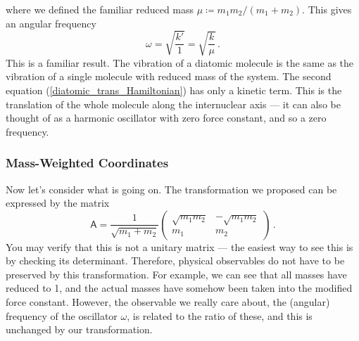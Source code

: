 \documentclass{article}
\theoremstyle{plain}\theoremheaderfont{\normalfont\itshape}\theorembodyfont{\rmfamily}\theoremseparator{.}\newtheorem*{rem}{Remark}\newtheorem*{ex}{Example}\newtheorem*{proof}{Proof}\newtheorem*{altp}{Alternative proof}
\theoremstyle{plain}\theoremheaderfont{\normalfont\bfseries}\theorembodyfont{\rmfamily}\theoremseparator{.}\newtheorem{thm}{Theorem}[section]\newtheorem{lem}[thm]{Lemma}\newtheorem{prop}[thm]{Proposition}\newtheorem*{cor}{Corollary}\newtheorem{defn}[thm]{Definition}\newtheorem{clm}[thm]{Claim}\newtheorem{clminproof}{Claim}
\theoremstyle{break}\theoremheaderfont{\normalfont\itshape}\theorembodyfont{\rmfamily}\theoremseparator{.\medskip}\newtheorem*{proofskip}{Proof}\newtheorem*{exs}{Examples}\newtheorem*{rems}{Remarks}
\theoremstyle{break}\theoremheaderfont{\normalfont\bfseries}\theorembodyfont{\rmfamily}\theoremseparator{.\medskip}\newtheorem{lemskip}[thm]{Lemma}\newtheorem{defnskip}[thm]{Definition}\newtheorem{propskip}[thm]{Proposition}\newtheorem{thmskip}[thm]{Theorem}
\numberwithin{equation}{section}
\begin{document}
    where we defined the familiar reduced mass \(\mu\coloneqq m_1m_2/(m_1+m_2)\). This gives an angular frequency
    \begin{equation}
        \omega=\sqrt{\frac{k'}{1}}=\sqrt{\frac{k}{\mu}}\,.
    \end{equation}
    This is a familiar result. The vibration of a diatomic molecule is the same as the vibration of a single molecule with reduced mass of the system. The second equation (\ref{diatomic_trans_Hamiltonian}) has only a kinetic term. This is the translation of the whole molecule along the internuclear axis --- it can also be thought of as a harmonic oscillator with zero force constant, and so a zero frequency.

    \subsubsection{Mass-Weighted Coordinates}
    Now let's consider what is going on. The transformation we proposed can be expressed by the matrix
    \begin{equation}
        \mathsf{A}=\frac{1}{\sqrt{m_1+m_2}}\begin{pmatrix}
            \sqrt{m_1m_2} & -\sqrt{m_1m_2} \\
            m_1 & m_2
        \end{pmatrix}\,.
    \end{equation}
    You may verify that this is not a unitary matrix --- the easiest way to see this is by checking its determinant. Therefore, physical observables do not have to be preserved by this transformation. For example, we can see that all masses have reduced to 1, and the actual masses have somehow been taken into the modified force constant. However, the observable we really care about, the (angular) frequency of the oscillator \(\omega\), is related to the ratio of these, and this is unchanged by our transformation.
\end{document}
